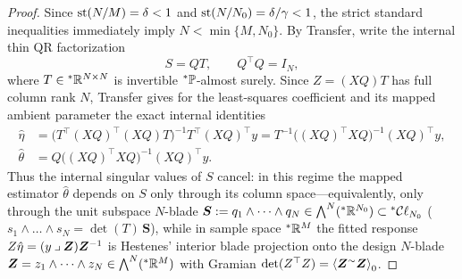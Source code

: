 \begin{proof}
Since $\operatorname{st}(N / M) = \delta < 1$ and $\operatorname{st}(N / N_0) = \delta / \gamma < 1$, the strict standard inequalities immediately imply $N < \min\{M, N_0\}$. By Transfer, write the internal thin QR factorization
\begin{equation}\label{eq:3.21}
S = QT, \qquad Q^\top Q = I_N,
\end{equation}
where $T \in {}^*\mathbb{R}^{N \times N}$ is invertible ${}^*\mathbb{P}$-almost surely. Since $Z = (XQ)T$ has full column rank $N$, Transfer gives for the least-squares coefficient and its mapped ambient parameter the exact internal identities
\begin{equation}\label{eq:3.22}
\begin{aligned}
\hat{\eta} &= \bigl(T^\top (XQ)^\top (XQ) T\bigr)^{-1} T^\top (XQ)^\top y = T^{-1}\bigl((XQ)^\top XQ\bigr)^{-1}(XQ)^\top y, \\
\hat{\theta} &= Q\bigl((XQ)^\top XQ\bigr)^{-1}(XQ)^\top y.
\end{aligned}
\end{equation}
Thus the internal singular values of $S$ cancel: in this regime the mapped estimator $\hat{\theta}$ depends on $S$ only through its column space---equivalently, only through the unit subspace $N$-blade $\bm{S} := q_1 \wedge \dots \wedge q_N \in \bigwedge^N({}^*\mathbb{R}^{N_0}) \subset {}^*\mathcal{C}\ell_{N_0}$ ($s_1 \wedge \dots \wedge s_N = \det(T)\,\bm{S}$), while in sample space ${}^*\mathbb{R}^M$ the fitted response $Z\hat{\eta} = (y \mathbin{\lrcorner} \bm{Z})\bm{Z}^{-1}$ is Hestenes' interior blade projection onto the design $N$-blade $\bm{Z} = z_1 \wedge \dots \wedge z_N \in \bigwedge^N({}^*\mathbb{R}^M)$ with Gramian $\det(Z^\top Z) = \left\langle \bm{Z}^{\sim}\bm{Z} \right\rangle_0$.


\end{proof}
